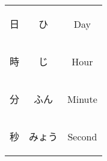 \begin{center}
\begin{table}[H]
\begin{tabular}{ccc}
		{\begin{CJK}{UTF8}{min} 日 \end{CJK}} & {\begin{CJK}{UTF8}{min} ひ \end{CJK}} & Day \\
		{\begin{CJK}{UTF8}{min} 時 \end{CJK}} & {\begin{CJK}{UTF8}{min} じ \end{CJK}} & Hour \\
		{\begin{CJK}{UTF8}{min} 分 \end{CJK}} & {\begin{CJK}{UTF8}{min} ふん \end{CJK}} & Minute \\
		{\begin{CJK}{UTF8}{min} 秒 \end{CJK}} & {\begin{CJK}{UTF8}{min} みょう \end{CJK}} & Second \\
		\bottomrule
	\end{tabular}
\end{table}


\end{center}



